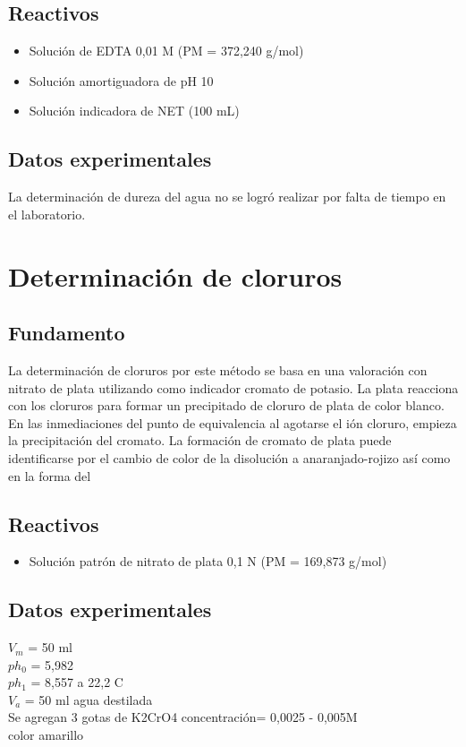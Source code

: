 \documentclass[a4paper,12pt]{article} %
\begin{document}
\subsection{Reactivos} 
\begin{itemize}
    \item{Solución de EDTA 0,01 M (PM = 372,240 g/mol) } 
    \item{Solución amortiguadora de pH 10}
    \item{Solución indicadora de NET (100 mL)} 
\end{itemize}

\subsection{Datos experimentales} 
La determinación de dureza del agua no se logró realizar por falta de tiempo en el laboratorio. 



\newpage

\section{Determinación de cloruros}

\subsection{Fundamento}
La determinación de cloruros por este método se basa en una valoración con nitrato de plata utilizando como indicador cromato de potasio. La plata reacciona con los cloruros para formar un precipitado de cloruro de plata de color blanco. En las inmediaciones del punto de equivalencia al agotarse el ión cloruro, empieza la precipitación del cromato. La formación de cromato de plata puede identificarse por el cambio de color de la disolución a anaranjado-rojizo así como en la forma del

\subsection{Reactivos} 
\begin{itemize}
    \item{Solución patrón de nitrato de plata 0,1 N (PM = 169,873 g/mol)} 
\end{itemize}

\subsection{Datos experimentales} 
$V_m$ = 50 ml \\
$ph_0$ = 5,982  \\
$ph_1$ = 8,557 a 22,2 C  \\
$V_a$ = 50 ml agua destilada \\
Se agregan 3 gotas de K2CrO4 concentración= 0,0025 - 0,005M \\
color amarillo \\
\end{document}
